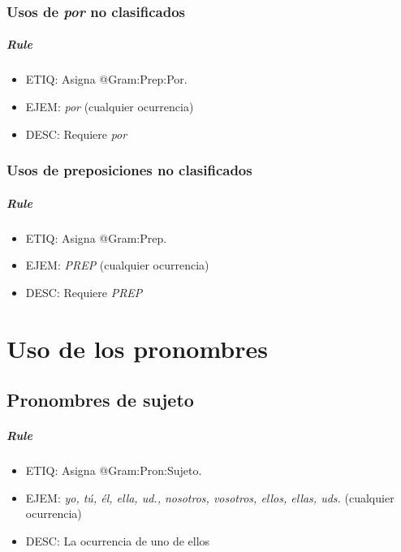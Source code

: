 \documentclass[11pt]{report}
\begin{document}
\subsection{Usos de \emph{por} no clasificados}
\paragraph*{Rule}
\begin{itemize}
\item ETIQ: Asigna @Gram:Prep:Por.
\item EJEM: \emph{por} (cualquier ocurrencia)
\item DESC: Requiere \emph{por}
\end{itemize}

\subsection{Usos de preposiciones no clasificados}
\paragraph*{Rule}
\begin{itemize}
\item ETIQ: Asigna @Gram:Prep.
\item EJEM: \emph{PREP} (cualquier ocurrencia)
\item DESC: Requiere \emph{PREP}
\end{itemize}

\chapter{Uso de los pronombres}
\section{Pronombres de sujeto}
\paragraph*{Rule}
\begin{itemize}
\item ETIQ: Asigna @Gram:Pron:Sujeto.
\item EJEM: \emph{yo, tú, él, ella, ud., nosotros, vosotros, ellos, ellas, uds.} (cualquier ocurrencia)
\item DESC: La ocurrencia de uno de ellos
\end{itemize}
\end{document}
